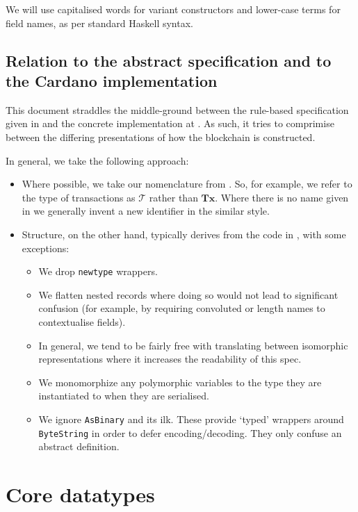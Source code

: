 \documentclass{article}
\newcommand{\txs}{\mathcal{T}}
\begin{document}
We will use capitalised words for variant constructors and lower-case
terms for field names, as per standard Haskell syntax.

\subsection{Relation to the abstract specification and to the Cardano implementation}

This document straddles the middle-ground between the rule-based specification
given in \cite{spiwack} and the concrete implementation at \cite{cardano}. As
such, it tries to comprimise between the differing presentations of how the
blockchain is constructed.

In general, we take the following approach:

\begin{itemize}
\item Where possible, we take our nomenclature from \cite{spiwack}. So, for
  example, we refer to the type of transactions as $\txs$ rather than
  $\textbf{Tx}$. Where there is no name given in \cite{spiwack} we generally
  invent a new identifier in the similar style.
\item Structure, on the other hand, typically derives from the code in
  \cite{cardano}, with some exceptions:
  \begin{itemize}
  \item We drop \verb|newtype| wrappers.
  \item We flatten nested records where doing so would not lead to significant
    confusion (for example, by requiring convoluted or length names to
    contextualise fields).
  \item In general, we tend to be fairly free with translating between
    isomorphic representations where it increases the readability of this spec.
  \item We monomorphize any polymorphic variables to the type they are
    instantiated to when they are serialised.
  \item We ignore \verb|AsBinary| and its ilk. These provide `typed' wrappers
    around \verb|ByteString| in order to defer encoding/decoding. They only
    confuse an abstract definition.
  \end{itemize}
\end{itemize}

\section{Core datatypes}
\label{sec:types}
\end{document}
